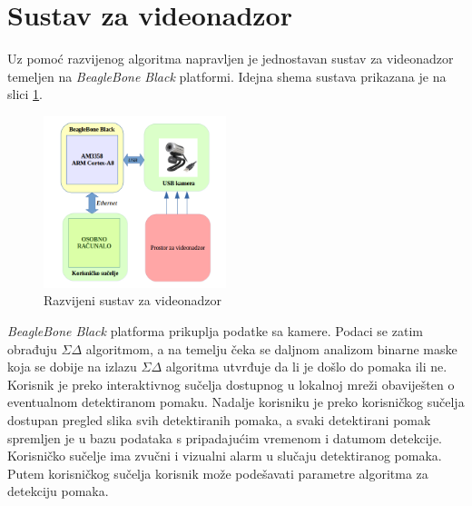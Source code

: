 \documentclass[a4paper,twocolumn]{article}
\begin{document}
\section{Sustav za videonadzor}
Uz pomoć razvijenog algoritma napravljen je jednostavan sustav za videonadzor
temeljen na \textit{BeagleBone Black} platformi. Idejna shema sustava prikazana
je na slici \ref{fig:sustav}.
\begin{figure}[bp!]\label{sustav}
\begin{center}
\includegraphics[height=5cm]{sustav_shema.png}
\caption{Razvijeni sustav za videonadzor}
\end{center}
\label{fig:sustav}
\end{figure}

\textit{BeagleBone Black} platforma prikuplja podatke sa kamere. Podaci se
zatim obrađuju \(\Sigma\Delta\) algoritmom, a na temelju čeka se daljnom
analizom binarne maske koja se dobije na izlazu \(\Sigma\Delta\) algoritma
utvrđuje da li je došlo do pomaka ili ne. Korisnik je preko interaktivnog
sučelja dostupnog u lokalnoj mreži obaviješten o eventualnom detektiranom
pomaku. Nadalje korisniku je preko korisničkog sučelja dostupan pregled slika
svih detektiranih pomaka, a svaki detektirani pomak spremljen je u bazu
podataka s pripadajućim vremenom i datumom detekcije. Korisničko sučelje ima
zvučni i vizualni alarm u slučaju detektiranog pomaka. Putem korisničkog sučelja
korisnik može podešavati parametre algoritma za detekciju pomaka.
\end{document}
